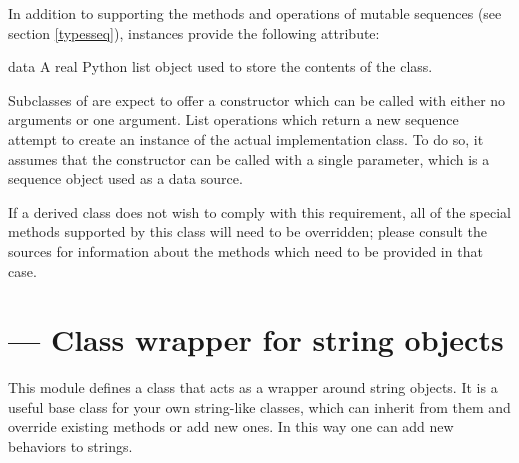 In addition to supporting the methods and operations of mutable
sequences (see section \ref{typesseq}),  instances
provide the following attribute:

\begin{memberdesc}{data}
A real Python list object used to store the contents of the
 class.
\end{memberdesc}

Subclasses of  are expect to offer a constructor which
can be called with either no arguments or one argument.  List
operations which return a new sequence attempt to create an instance
of the actual implementation class.  To do so, it assumes that the
constructor can be called with a single parameter, which is a sequence
object used as a data source.

If a derived class does not wish to comply with this requirement, all
of the special methods supported by this class will need to be
overridden; please consult the sources for information about the
methods which need to be provided in that case.



\section{ ---
         Class wrapper for string objects}



This module defines a class that acts as a wrapper around string
objects.  It is a useful base class for your own string-like classes,
which can inherit from them and override existing methods or add new
ones.  In this way one can add new behaviors to strings.

